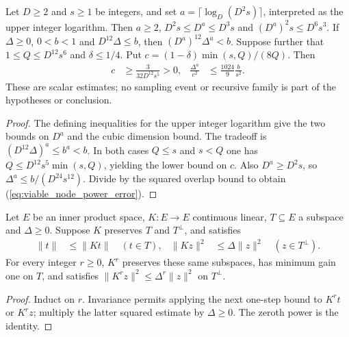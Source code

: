 \begin{lemma}
    \label{thm:viable_node_power_parameters}
    \leanok
    Let $D\ge2$ and $s\ge1$ be integers, and set
    $a=\lceil\log_D(D^2s)\rceil$, interpreted as the upper integer logarithm.
    Then $a\ge2$, $D^2s\le D^a\le D^3s$ and
    $(D^a)^2s\le D^6s^3$.
    If $\Delta\ge0$, $0<b<1$ and $D^{12}\Delta\le b$, then
    $(D^a)^{12}\Delta^a<b$.
    Suppose further that $1\le Q\le D^{12}s^6$ and $\delta\le1/4$. Put
    $c=(1-\delta)\min(s,Q)/(8Q)$. Then
    \begin{align}
        c                    & \ge\frac{3}{32D^{12}s^5}>0,     &
        \frac{\Delta^a}{c^2} & \le\frac{1024}{9}\frac{b}{s^2}.
        \label{eq:viable_node_power_error}
    \end{align}
    These are scalar estimates; no sampling event or recursive family is
    part of the hypotheses or conclusion.
\end{lemma}
\begin{proof}\leanok
    The defining inequalities for the upper integer logarithm give the
    two bounds on $D^a$ and the cubic dimension bound. The tradeoff is
    $(D^{12}\Delta)^a\le b^a<b$.
    In both cases $Q\le s$ and $s<Q$ one has
    $Q\le D^{12}s^5\min(s,Q)$, yielding the lower bound on $c$.
    Also $D^a\ge D^2s$, so
    $\Delta^a\le b/(D^{24}s^{12})$. Divide by the squared overlap bound
    to obtain (\ref{eq:viable_node_power_error}).
\end{proof}

\begin{lemma}
    \label{lem:invariant_operator_bounds_pow}
    \leanok
    Let $E$ be an inner product space, $K:E\to E$ continuous linear,
    $T\subseteq E$ a subspace and $\Delta\ge0$. Suppose $K$ preserves
    $T$ and $T^\perp$, and satisfies
    \begin{align}
        \|t\|&\le\|Kt\| \quad(t\in T),&
        \|Kz\|^2&\le\Delta\|z\|^2 \quad(z\in T^\perp).
    \end{align}
    For every integer $r\ge0$, $K^r$ preserves these same subspaces,
    has minimum gain one on $T$, and satisfies
    $\|K^rz\|^2\le\Delta^r\|z\|^2$ on $T^\perp$.
\end{lemma}
\begin{proof}\leanok
    Induct on $r$. Invariance permits applying the next one-step bound
    to $K^rt$ or $K^rz$; multiply the latter squared estimate by
    $\Delta\ge0$. The zeroth power is the identity.
\end{proof}

